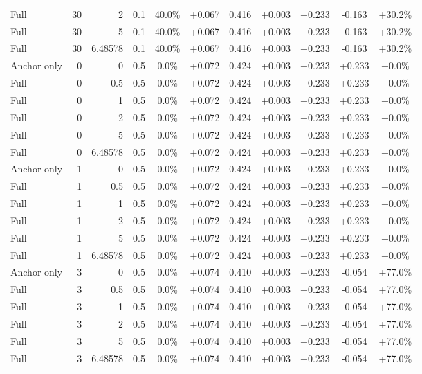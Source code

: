 \begin{table}[htbp]
\begin{tabular}{lrrrccccccc}
Full & 30 & 2 & 0.1 & 40.0\% & +0.067 & 0.416 & +0.003 & +0.233 & -0.163 & +30.2\% \\
Full & 30 & 5 & 0.1 & 40.0\% & +0.067 & 0.416 & +0.003 & +0.233 & -0.163 & +30.2\% \\
Full & 30 & 6.48578 & 0.1 & 40.0\% & +0.067 & 0.416 & +0.003 & +0.233 & -0.163 & +30.2\% \\
Anchor only & 0 & 0 & 0.5 & 0.0\% & +0.072 & 0.424 & +0.003 & +0.233 & +0.233 & +0.0\% \\
Full & 0 & 0.5 & 0.5 & 0.0\% & +0.072 & 0.424 & +0.003 & +0.233 & +0.233 & +0.0\% \\
Full & 0 & 1 & 0.5 & 0.0\% & +0.072 & 0.424 & +0.003 & +0.233 & +0.233 & +0.0\% \\
Full & 0 & 2 & 0.5 & 0.0\% & +0.072 & 0.424 & +0.003 & +0.233 & +0.233 & +0.0\% \\
Full & 0 & 5 & 0.5 & 0.0\% & +0.072 & 0.424 & +0.003 & +0.233 & +0.233 & +0.0\% \\
Full & 0 & 6.48578 & 0.5 & 0.0\% & +0.072 & 0.424 & +0.003 & +0.233 & +0.233 & +0.0\% \\
Anchor only & 1 & 0 & 0.5 & 0.0\% & +0.072 & 0.424 & +0.003 & +0.233 & +0.233 & +0.0\% \\
Full & 1 & 0.5 & 0.5 & 0.0\% & +0.072 & 0.424 & +0.003 & +0.233 & +0.233 & +0.0\% \\
Full & 1 & 1 & 0.5 & 0.0\% & +0.072 & 0.424 & +0.003 & +0.233 & +0.233 & +0.0\% \\
Full & 1 & 2 & 0.5 & 0.0\% & +0.072 & 0.424 & +0.003 & +0.233 & +0.233 & +0.0\% \\
Full & 1 & 5 & 0.5 & 0.0\% & +0.072 & 0.424 & +0.003 & +0.233 & +0.233 & +0.0\% \\
Full & 1 & 6.48578 & 0.5 & 0.0\% & +0.072 & 0.424 & +0.003 & +0.233 & +0.233 & +0.0\% \\
Anchor only & 3 & 0 & 0.5 & 0.0\% & +0.074 & 0.410 & +0.003 & +0.233 & -0.054 & +77.0\% \\
Full & 3 & 0.5 & 0.5 & 0.0\% & +0.074 & 0.410 & +0.003 & +0.233 & -0.054 & +77.0\% \\
Full & 3 & 1 & 0.5 & 0.0\% & +0.074 & 0.410 & +0.003 & +0.233 & -0.054 & +77.0\% \\
Full & 3 & 2 & 0.5 & 0.0\% & +0.074 & 0.410 & +0.003 & +0.233 & -0.054 & +77.0\% \\
Full & 3 & 5 & 0.5 & 0.0\% & +0.074 & 0.410 & +0.003 & +0.233 & -0.054 & +77.0\% \\
Full & 3 & 6.48578 & 0.5 & 0.0\% & +0.074 & 0.410 & +0.003 & +0.233 & -0.054 & +77.0\% \\

\end{tabular}
\end{table}
